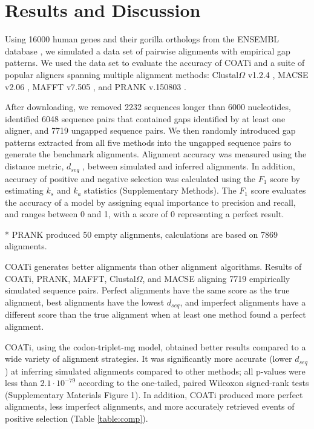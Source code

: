 \section*{Results and Discussion}
Using 16000 human genes and their gorilla orthologs from the ENSEMBL
database , we simulated a data set of pairwise
alignments with empirical gap patterns.
We used the data set to evaluate the accuracy of COATi and a suite of popular aligners spanning multiple alignment methods:
Clustal$\Omega$ v1.2.4 ,
MACSE v2.06 , MAFFT v7.505
, and PRANK v.150803 .

After downloading, we removed 2232 sequences longer than 6000 nucleotides, identified 6048 sequence pairs that contained gaps identified by at least one aligner, and 7719 ungapped sequence pairs.
We then randomly introduced gap patterns extracted from all five methods into the ungapped sequence pairs to generate the benchmark alignments.
Alignment accuracy was measured using the distance metric, $d_{seq}$
, between simulated and inferred
alignments.
In addition, accuracy of positive and negative selection was calculated
using the $F_1$ score by estimating $k_s$ and $k_a$ statistics
 (Supplementary Methods).
The $F_1$ score evaluates the accuracy of a model by assigning equal importance to precision and recall, and ranges between 0 and 1, with a score of 0 representing a perfect result.

\begin{table}[!ht]
\centering

 \vspace{1mm}
 \footnotesize{* PRANK produced 50 empty alignments, calculations are based on 7869 alignments.}
 \caption{COATi generates better alignments than other alignment algorithms. Results of COATi, PRANK, MAFFT, Clustal$\Omega$, and MACSE aligning 7719 empirically simulated sequence pairs. Perfect alignments have the same score as the true alignment, best alignments have the lowest $d_{seq}$, and imperfect alignments have a different score than the true alignment when at least one method found a perfect alignment.}
 \label{table:comp}
\end{table}

COATi, using the codon-triplet-mg model, obtained better results compared to a wide variety of alignment strategies.
It was significantly more accurate (lower $d_{seq}$) at inferring simulated alignments compared to other methods; all p-values were less than $2.1 \cdot 10^{-79}$ according to the one-tailed, paired Wilcoxon signed-rank tests (Supplementary Materials Figure 1).
%
In addition, COATi produced more perfect alignments, less imperfect alignments, and more accurately retrieved events of positive selection (Table \ref{table:comp}).

